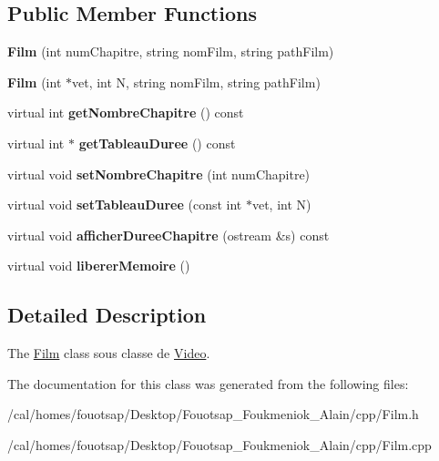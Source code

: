 \subsection*{Public Member Functions}
\begin{DoxyCompactItemize}
\item 
\hypertarget{class_film_add96a21aaa3ae32a9bb860ddafeb48ff}{{\bfseries Film} (int num\+Chapitre, string nom\+Film, string path\+Film)}\label{class_film_add96a21aaa3ae32a9bb860ddafeb48ff}

\item 
\hypertarget{class_film_aee1f05dbc38270e72186bedfc55c7d74}{{\bfseries Film} (int $\ast$vet, int N, string nom\+Film, string path\+Film)}\label{class_film_aee1f05dbc38270e72186bedfc55c7d74}

\item 
\hypertarget{class_film_acc6f65afe85fdc48ff52072149664d22}{virtual int {\bfseries get\+Nombre\+Chapitre} () const }\label{class_film_acc6f65afe85fdc48ff52072149664d22}

\item 
\hypertarget{class_film_aeb014e6e9401a70e7787053a6e8bc6a1}{virtual int $\ast$ {\bfseries get\+Tableau\+Duree} () const }\label{class_film_aeb014e6e9401a70e7787053a6e8bc6a1}

\item 
\hypertarget{class_film_ac610b7fc13d8903e6c06af1864f2bcea}{virtual void {\bfseries set\+Nombre\+Chapitre} (int num\+Chapitre)}\label{class_film_ac610b7fc13d8903e6c06af1864f2bcea}

\item 
\hypertarget{class_film_a07054ea86fee34dbc716269dee9803cf}{virtual void {\bfseries set\+Tableau\+Duree} (const int $\ast$vet, int N)}\label{class_film_a07054ea86fee34dbc716269dee9803cf}

\item 
\hypertarget{class_film_a250b49e275035c8bcaec3cf1d0627b4e}{virtual void {\bfseries afficher\+Duree\+Chapitre} (ostream \&s) const }\label{class_film_a250b49e275035c8bcaec3cf1d0627b4e}

\item 
\hypertarget{class_film_aab7e0aacfdf61b43e3fecda2aad8d7c7}{virtual void {\bfseries liberer\+Memoire} ()}\label{class_film_aab7e0aacfdf61b43e3fecda2aad8d7c7}

\end{DoxyCompactItemize}


\subsection{Detailed Description}
The \hyperlink{class_film}{Film} class sous classe de \hyperlink{class_video}{Video}. 

The documentation for this class was generated from the following files\+:\begin{DoxyCompactItemize}
\item 
/cal/homes/fouotsap/\+Desktop/\+Fouotsap\+\_\+\+Foukmeniok\+\_\+\+Alain/cpp/Film.\+h\item 
/cal/homes/fouotsap/\+Desktop/\+Fouotsap\+\_\+\+Foukmeniok\+\_\+\+Alain/cpp/Film.\+cpp\end{DoxyCompactItemize}
